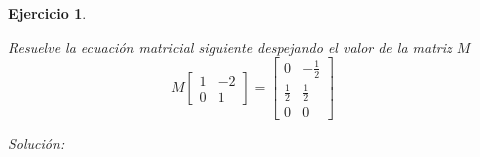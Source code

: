 \documentclass[12pt]{amsart}
\newtheorem{ejer}{Ejercicio}
\begin{document}
\begin{ejer}
\noindent\begin{minipage}{\textwidth} 
\begin{tcolorbox}[colback = red!20!white,title=Versión Ecuación Matricial]
Resuelve la ecuación matricial siguiente despejando el valor de la matriz $M$
\[M \left[\begin{array}{rr}
1 & -2 \\
0 & 1
\end{array}\right] = \left[\begin{array}{rr}
0 & -\frac{1}{2} \\
\frac{1}{2} & \frac{1}{2} \\
0 & 0
\end{array}\right] \quad 
\]
\end{tcolorbox}
\end{minipage}%
\end{ejer}


{\it Soluci\'on:}

\end{document}
